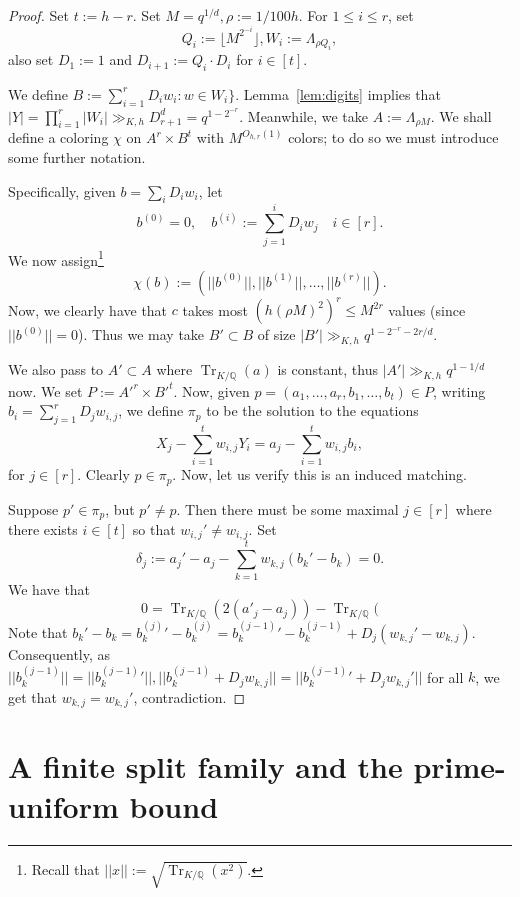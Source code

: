 \documentclass[11pt]{article}
\theoremstyle{plain}
\theoremstyle{remark}
\newcommand{\Q}{\mathbb Q}
\newcommand{\Tr}{\operatorname{Tr}_{K/\Q}}
\begin{document}
\begin{proof}
    Set $t:= h-r$. Set $M=q^{1/d},\rho := 1/100h$. For $1\le i \le r$, set
    \[Q_i := \lfloor M^{2^{-i}}\rfloor, W_i := \Lambda_{\rho Q_i},\]also set $D_1 := 1$ and $D_{i+1} := Q_i\cdot D_i$ for $i\in [t]$. 

    We define $B:= \sum_{i=1}^r D_iw_i:w\in W_i\}$. Lemma~\ref{lem:digits} implies that $|Y| = \prod_{i=1}^r |W_i| \gg_{K,h} D_{r+1}^d = q^{1-2^{-r}}$. Meanwhile, we take $A:= \Lambda_{\rho M}$. We shall define a coloring $\chi$ on $A^r\times B^t$ with $M^{O_{h,r}(1)}$ colors; to do so we must introduce some further notation.

    Specifically, given $b=\sum_i D_iw_i$, let \[b^{(0)}=0,\quad b^{(i)} := \sum_{j=1}^i D_i w_j\quad i\in [r].\]We now assign\footnote{Recall that $||x||:= \sqrt{\Tr(x^2)}$.}
    \[\chi(b) := (||b^{(0)}||,||b^{(1)}||,\dots,||b^{(r)}||).\]Now, we clearly have that $c$ takes most $(h(\rho M)^2)^r\le M^{2r}$ values (since $||b^{(0)}||=0$). Thus we may take $B'\subset B$ of size $|B'|\gg_{K,h}q^{1-2^{-r}-2r/d}$.

    We also pass to $A'\subset A$ where $\Tr(a)$ is constant, thus $|A'|\gg_{K,h} q^{1-1/d}$ now. We set $P:= A'^r\times B'^t$. Now, given $p=(a_1,\dots,a_r,b_1,\dots,b_t)\in P$, writing $b_i = \sum_{j=1}^r D_j w_{i,j}$, we define $\pi_p$ to be the solution to the equations
    \[X_j-\sum_{i=1}^t w_{i,j}Y_i = a_j-\sum_{i=1}^t w_{i,j}b_i,\]for $j\in [r]$. Clearly $p\in \pi_p$. Now, let us verify this is an induced matching. 

    Suppose $p'\in \pi_p$, but $p'\neq p$. Then there must be some maximal $j\in [r]$ where there exists $i\in [t]$ so that $w_{i,j}'\neq w_{i,j}$. Set
    \[\delta_j := a_j'-a_j -\sum_{k=1}^t w_{k,j}(b_k'-b_k)=0.\]
    We have that 
    \[0 = \Tr(2(a'_j-a_j))-\Tr(\]
    Note that $b_k'-b_k= b_{k}^{(j)}'-b_{k}^{(j)}= b_{k}^{(j-1)}'-b_{k}^{(j-1)}+D_j(w_{k,j}'-w_{k,j})$. Consequently, as $||b_{k}^{(j-1)}||=||b_{k}^{(j-1)}'||,||b_{k}^{(j-1)}+D_jw_{k,j}||=||b_{k}^{(j-1)}'+D_jw_{k,j}'||$ for all $k$, we get that $w_{k,j}=w_{k,j}'$, contradiction.
\end{proof}

\section{A finite split family and the prime-uniform bound}
\end{document}

